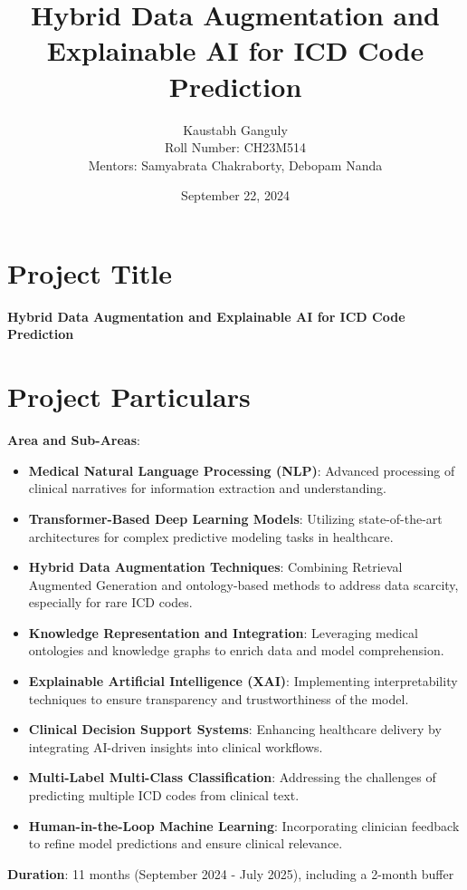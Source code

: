 \documentclass[10pt,a4paper]{article}
\title{Hybrid Data Augmentation and Explainable AI for ICD Code Prediction}
\author{
    Kaustabh Ganguly \\
    Roll Number: CH23M514 \\
    Mentors: Samyabrata Chakraborty, Debopam Nanda \\
}
\date{September 22, 2024}
\begin{document}
\maketitle

\section{Project Title}
\textbf{Hybrid Data Augmentation and Explainable AI for ICD Code Prediction}

\section{Project Particulars}
\textbf{Area and Sub-Areas}: 
\begin{itemize}
    \item \textbf{Medical Natural Language Processing (NLP)}: Advanced processing of clinical narratives for information extraction and understanding.
    \item \textbf{Transformer-Based Deep Learning Models}: Utilizing state-of-the-art architectures for complex predictive modeling tasks in healthcare.
    \item \textbf{Hybrid Data Augmentation Techniques}: Combining Retrieval Augmented Generation and ontology-based methods to address data scarcity, especially for rare ICD codes.
    \item \textbf{Knowledge Representation and Integration}: Leveraging medical ontologies and knowledge graphs to enrich data and model comprehension.
    \item \textbf{Explainable Artificial Intelligence (XAI)}: Implementing interpretability techniques to ensure transparency and trustworthiness of the model.
    \item \textbf{Clinical Decision Support Systems}: Enhancing healthcare delivery by integrating AI-driven insights into clinical workflows.
    \item \textbf{Multi-Label Multi-Class Classification}: Addressing the challenges of predicting multiple ICD codes from clinical text.
    \item \textbf{Human-in-the-Loop Machine Learning}: Incorporating clinician feedback to refine model predictions and ensure clinical relevance.
\end{itemize}

\textbf{Duration}: 11 months (September 2024 - July 2025), including a 2-month buffer

\end{document}
